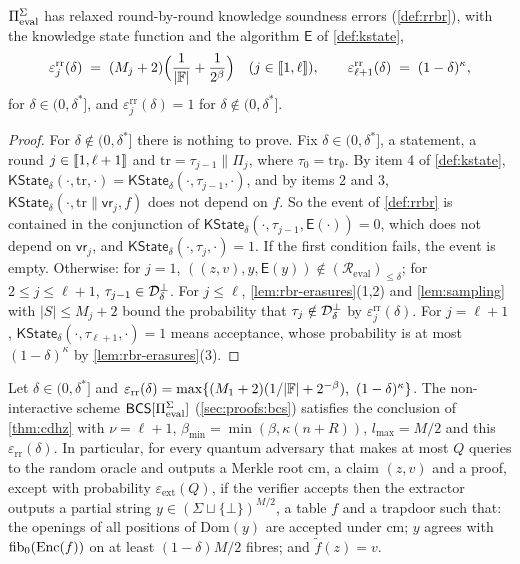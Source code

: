 \begin{theorem}\label{thm:rrbr}
$\Pi_{\mathrm{eval}}^{\Sigma}$ has relaxed round-by-round knowledge soundness errors (\cref{def:rrbr}), with the knowledge state function and the algorithm $\mathsf{E}$ of \cref{def:kstate},
\[
  \varepsilon^{\mathrm{rr}}_j(\delta) \;=\; (M_j + 2)\Bigl(\frac{1}{|\mathbb{F}|} + \frac{1}{2^\beta}\Bigr) \quad (j \in \llbracket 1, \ell \rrbracket), \qquad \varepsilon^{\mathrm{rr}}_{\ell+1}(\delta) \;=\; (1-\delta)^{\kappa},
\]
for $\delta \in (0, \delta^*]$, and $\varepsilon^{\mathrm{rr}}_j(\delta) = 1$ for $\delta \notin (0, \delta^*]$.
\end{theorem}

\begin{proof}
For $\delta \notin (0,\delta^*]$ there is nothing to prove. Fix $\delta \in (0,\delta^*]$, a statement, a round $j \in \llbracket 1, \ell+1 \rrbracket$ and $\mathrm{tr} = \tau_{j-1} \| \Pi_j$, where $\tau_0 = \mathrm{tr}_\emptyset$.
By item 4 of \cref{def:kstate}, $\mathsf{KState}_\delta(\cdot, \mathrm{tr}, \cdot) = \mathsf{KState}_\delta(\cdot, \tau_{j-1}, \cdot)$, and by items 2 and 3, $\mathsf{KState}_\delta(\cdot, \mathrm{tr}\|\mathsf{vr}_j, f)$ does not depend on $f$.
So the event of \cref{def:rrbr} is contained in the conjunction of $\mathsf{KState}_\delta(\cdot, \tau_{j-1}, \mathsf{E}(\cdot)) = 0$, which does not depend on $\mathsf{vr}_j$, and $\mathsf{KState}_\delta(\cdot, \tau_j, \cdot) = 1$.
If the first condition fails, the event is empty. Otherwise:
for $j = 1$, $((z,v), y, \mathsf{E}(y)) \notin (\mathcal{R}_{\mathrm{eval}})_{\le\delta}$; for $2 \le j \le \ell+1$, $\tau_{j-1} \in \mathcal{D}^{\bot}_\delta$.
For $j \le \ell$, \cref{lem:rbr-erasures}(1,2) and \cref{lem:sampling} with $|S| \le M_j + 2$ bound the probability that $\tau_j \notin \mathcal{D}^{\bot}_\delta$ by $\varepsilon^{\mathrm{rr}}_j(\delta)$.
For $j = \ell+1$, $\mathsf{KState}_\delta(\cdot, \tau_{\ell+1}, \cdot) = 1$ means acceptance, whose probability is at most $(1-\delta)^\kappa$ by \cref{lem:rbr-erasures}(3).
\end{proof}

\begin{corollary}\label{cor:pq}
Let $\delta \in (0,\delta^*]$ and $\varepsilon_{\mathrm{rr}}(\delta) = \max\{(M_1+2)(1/|\mathbb{F}| + 2^{-\beta}),\ (1-\delta)^{\kappa}\}$.
The non-interactive scheme $\mathsf{BCS}[\Pi_{\mathrm{eval}}^{\Sigma}]$ (\cref{sec:proofs:bcs}) satisfies the conclusion of \cref{thm:cdhz} with $\nu = \ell + 1$, $\beta_{\min} = \min(\beta, \kappa(n+R))$, $l_{\max} = M/2$ and this $\varepsilon_{\mathrm{rr}}(\delta)$.
In particular, for every quantum adversary that makes at most $Q$ queries to the random oracle and outputs a Merkle root $\mathrm{cm}$, a claim $(z, v)$ and a proof, except with probability $\varepsilon_{\mathrm{ext}}(Q)$, if the verifier accepts then the extractor outputs a partial string $y \in (\Sigma \sqcup \{\bot\})^{M/2}$, a table $f$ and a trapdoor such that:
the openings of all positions of $\mathrm{Dom}(y)$ are accepted under $\mathrm{cm}$; $y$ agrees with $\mathrm{fib}_0(\mathrm{Enc}(f))$ on at least $(1-\delta)M/2$ fibres; and $\tilde f(z) = v$.
\end{corollary}

